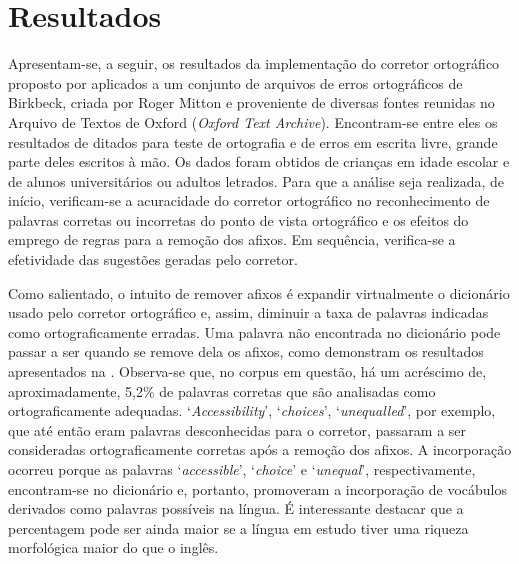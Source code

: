 \documentclass{textolivre}
\begin{document}




\section{Resultados}
Apresentam-se, a seguir, os resultados 
da implementação do corretor
ortográfico proposto
por \textcite{norvig2007} aplicados
a um conjunto de arquivos de erros ortográficos de Birkbeck, criada por Roger Mitton e proveniente de diversas fontes reunidas no
Arquivo de Textos de Oxford (\textit{Oxford Text Archive}). Encontram-se entre eles os resultados de ditados para teste de ortografia e de erros em escrita livre,
grande parte deles escritos à mão. Os dados foram obtidos de crianças em idade escolar e de alunos universitários ou adultos letrados. Para que a análise
seja realizada, de início, verificam-se a acuracidade do corretor 
ortográfico no reconhecimento de palavras corretas ou incorretas
do ponto de vista ortográfico e os efeitos do emprego de regras para a
remoção dos afixos. Em sequência, verifica-se  a
efetividade das sugestões geradas pelo corretor.

Como salientado, o intuito de remover afixos é expandir
virtualmente o dicionário usado pelo corretor
ortográfico e, assim, diminuir a taxa de palavras indicadas
como ortograficamente erradas. Uma palavra não
encontrada no dicionário pode passar a ser quando se
remove dela os afixos, como demonstram
os resultados apresentados na . Observa-se que, no
corpus em questão, há um acréscimo de, aproximadamente,
5,2\% de palavras corretas que são analisadas como
ortograficamente adequadas.
`\textit{Accessibility}', `\textit{choices}', `\textit{unequalled}', por exemplo, que até então
eram palavras desconhecidas para o corretor, passaram a ser consideradas
ortograficamente corretas após a remoção dos afixos. A incorporação
ocorreu porque as palavras `\textit{accessible}', `\textit{choice}' e `\textit{unequal}', respectivamente, 
encontram-se no dicionário e, portanto, promoveram a incorporação de vocábulos derivados
como palavras possíveis na língua. É interessante destacar que a percentagem
pode ser ainda maior se a língua em estudo tiver uma riqueza morfológica
maior do que o inglês.
\end{document}
